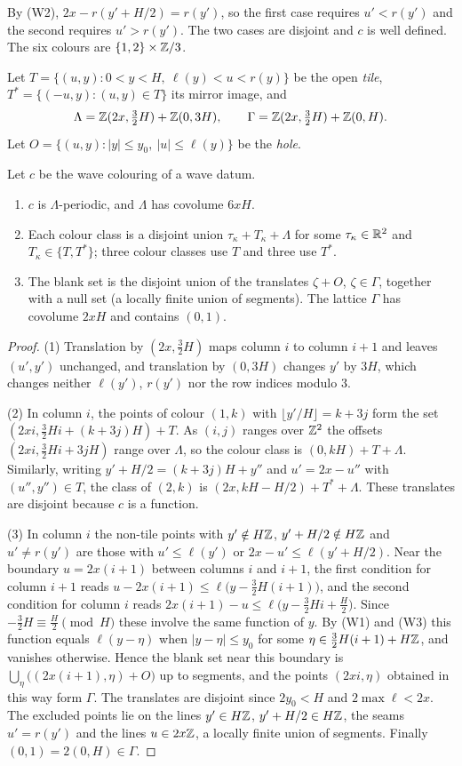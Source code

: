 \documentclass[11pt,colorlinks]{charlie}
\begin{document}
By (W2), $2x-r(y'+H/2)=r(y')$, so the first case requires $u'<r(y')$ and the second requires $u'>r(y')$. The two cases are disjoint and $c$ is well defined. The six colours are $\{1,2\}\times\mathbb{Z}/3$.

Let $T=\{(u,y):0<y<H,\ \ell(y)<u<r(y)\}$ be the open \emph{tile}, $T^*=\{(-u,y):(u,y)\in T\}$ its mirror image, and
\[
 \Lambda=\mathbb{Z}(2x,\tfrac32H)+\mathbb{Z}(0,3H),\qquad \Gamma=\mathbb{Z}(2x,\tfrac32H)+\mathbb{Z}(0,H).
\]
Let $O=\{(u,y):|y|\le y_0,\ |u|\le\ell(y)\}$ be the \emph{hole}.

\begin{lemma}[Structure]\label{lem:structure}
Let $c$ be the wave colouring of a wave datum.
\begin{enumerate}
\item $c$ is $\Lambda$-periodic, and $\Lambda$ has covolume $6xH$.
\item Each colour class is a disjoint union $\tau_\kappa+T_\kappa+\Lambda$ for some $\tau_\kappa\in\mathbb{R}^2$ and $T_\kappa\in\{T,T^*\}$; three colour classes use $T$ and three use $T^*$.
\item The blank set is the disjoint union of the translates $\zeta+O$, $\zeta\in\Gamma$, together with a null set (a locally finite union of segments). The lattice $\Gamma$ has covolume $2xH$ and contains $(0,1)$.
\end{enumerate}
\end{lemma}

\begin{proof}
(1) Translation by $(2x,\tfrac32H)$ maps column $i$ to column $i+1$ and leaves $(u',y')$ unchanged, and translation by $(0,3H)$ changes $y'$ by $3H$, which changes neither $\ell(y')$, $r(y')$ nor the row indices modulo $3$.

(2) In column $i$, the points of colour $(1,k)$ with $\lfloor y'/H\rfloor=k+3j$ form the set $(2xi,\tfrac32Hi+(k+3j)H)+T$. As $(i,j)$ ranges over $\mathbb{Z}^2$ the offsets $(2xi,\tfrac32 Hi+3jH)$ range over $\Lambda$, so the colour class is $(0,kH)+T+\Lambda$. Similarly, writing $y'+H/2=(k+3j)H+y''$ and $u'=2x-u''$ with $(u'',y'')\in T$, the class of $(2,k)$ is $(2x,kH-H/2)+T^*+\Lambda$. These translates are disjoint because $c$ is a function.

(3) In column $i$ the non-tile points with $y'\notin H\mathbb{Z}$, $y'+H/2\notin H\mathbb{Z}$ and $u'\ne r(y')$ are those with $u'\le\ell(y')$ or $2x-u'\le\ell(y'+H/2)$. Near the boundary $u=2x(i+1)$ between columns $i$ and $i+1$, the first condition for column $i+1$ reads $u-2x(i+1)\le\ell\big(y-\tfrac32H(i+1)\big)$, and the second condition for column $i$ reads $2x(i+1)-u\le\ell\big(y-\tfrac32Hi+\tfrac H2\big)$. Since $-\tfrac32H\equiv\tfrac H2\pmod H$ these involve the same function of $y$. By (W1) and (W3) this function equals $\ell(y-\eta)$ when $|y-\eta|\le y_0$ for some $\eta\in\tfrac32H(i+1)+H\mathbb{Z}$, and vanishes otherwise. Hence the blank set near this boundary is $\bigcup_\eta\big((2x(i+1),\eta)+O\big)$ up to segments, and the points $(2xi,\eta)$ obtained in this way form $\Gamma$. The translates are disjoint since $2y_0<H$ and $2\max\ell<2x$. The excluded points lie on the lines $y'\in H\mathbb{Z}$, $y'+H/2\in H\mathbb{Z}$, the seams $u'=r(y')$ and the lines $u\in2x\mathbb{Z}$, a locally finite union of segments. Finally $(0,1)=2(0,H)\in\Gamma$.
\end{proof}
\end{document}
